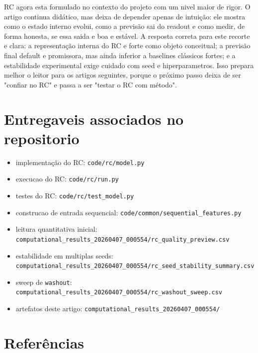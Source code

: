 \documentclass[12pt]{article}
\providecommand{\tightlist}{%
              \setlength{\itemsep}{0pt}\setlength{\parskip}{0pt}}
\begin{document}
RC agora esta formulado no contexto do projeto com um nivel maior de rigor. O artigo continua didático, mas deixa de depender apenas de intuição: ele mostra como o estado interno evolui, como a previsão sai do readout e como medir, de forma honesta, se essa saida e boa e estável. A resposta correta para este recorte e clara: a representação interna do RC e forte como objeto conceitual; a previsão final default e promissora, mas ainda inferior a baselines clássicos fortes; e a estabilidade experimental exige cuidado com seed e hiperparametros. Isso prepara melhor o leitor para os artigos seguintes, porque o próximo passo deixa de ser "confiar no RC" e passa a ser "testar o RC com método".

\section*{Entregaveis associados no repositorio}\label{entregaveis-associados-no-repositorio}

\begin{itemize}
\tightlist
\item
  implementação do RC: \texttt{code/rc/model.py}
\item
  execucao do RC: \texttt{code/rc/run.py}
\item
  testes do RC: \texttt{code/rc/test\_model.py}
\item
  construcao de entrada sequencial: \texttt{code/common/sequential\_features.py}
\item
  leitura quantitativa inicial: \texttt{computational\_results\_20260407\_000554/rc\_quality\_preview.csv}
\item
  estabilidade em multiplas seeds: \texttt{computational\_results\_20260407\_000554/rc\_seed\_stability\_summary.csv}
\item
  sweep de \texttt{washout}: \texttt{computational\_results\_20260407\_000554/rc\_washout\_sweep.csv}
\item
  artefatos deste artigo: \texttt{computational\_results\_20260407\_000554/}
\end{itemize}

\section{Referências}\label{referencias}
\end{document}
